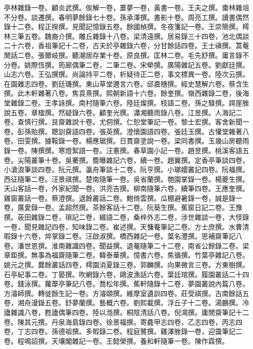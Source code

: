 \begin{pinyinscope}
亭林雜錄一卷。顧炎武撰。俟解一卷，噩夢一卷，黃書一卷。王夫之撰。棗林雜俎不分卷。談遷撰。春明夢餘錄七十卷。孫承澤撰。書影十卷。周亮工撰。讀書偶然錄十二卷。程正揆撰。見聞記憶錄五卷。餘國楨撰。冬夜箋記一卷。王崇簡撰。樗林三筆五卷。魏裔介撰。雕丘雜錄十八卷。梁清遠撰。居易錄三十四卷，池北偶談二十六卷，香祖筆記十二卷，古夫於亭雜錄六卷，分甘餘話四卷。王士禛撰。蒿菴閒話二卷。張爾岐撰。聽潮居存業十卷。原良撰。匡林二卷。毛先舒撰。庸言錄不分卷。姚際恆撰。筠廊偶筆二卷，二筆二卷。宋犖撰。廣陽雜記五卷。劉獻廷撰。山志六卷。王弘撰撰。尚論持平二卷，析疑待正二卷，事文標異一卷。陸次云撰。在園雜志四卷。劉廷璣撰。東山草堂邇言六卷。邱嘉穗撰。經史慧解六卷。蔡含生撰。此木軒雜著八卷。焦袁熹撰。熙朝新語十六卷。餘奎撰。嶺西雜錄二卷，後海堂雜錄二卷。王孝詠撰。南村隨筆六卷。陸廷燦撰。枝語二卷。孫之騄撰。諤崖脞說五卷。章楹撰。然疑錄六卷。顧奎光撰。瀟湘聽雨錄八卷。江昱撰。人海記二卷。查慎行撰。艮齋雜說十卷。尤侗撰。仁恕堂筆記一卷。黎士宏撰。客舍新聞一卷。彭孫貽撰。聰訓齋語四卷。張英撰。澄懷園語四卷。張廷玉撰。古懽堂雜著八卷。田雯撰。據鞍錄一卷。楊應琚撰。日貫齋塗說一卷。梁同書撰。玉幾山房聽雨錄一卷。陳撰撰。寒燈絮語一卷。汪憲撰。春草園小記一卷。趙昱撰。桃溪客語五卷。尖陽叢筆十卷。吳騫撰。簷曝雜記六卷，續一卷。趙翼撰。定香亭筆談四卷，小滄浪筆談四卷。阮元撰。瀛舟筆談十二卷。阮亨撰。小瑯嬛叢記四卷。阮福撰。西征隨筆二卷。汪景祺撰。楚南隨筆一卷。吳省蘭撰。匏園掌錄一卷。楊夔生撰。天山客話一卷，外家紀聞一卷。洪亮吉撰。柳南隨筆六卷，續筆四卷。王應奎撰。雞窗叢話一卷。蔡澄撰。退餘叢話二卷。鮑倚雲撰。瓜棚避暑錄一卷，誠是錄一卷，廣愛錄一卷。孟超然撰。茶餘客話十二卷。阮葵生撰。蕉窗日記二卷。王豫撰。荍田雜錄二卷，瑣記二卷，綴語二卷，桑梓外志二卷，涉世雜談一卷，大怪錄一卷，聞見雜記四卷，知味錄二卷。崔述撰。天慵菴筆記二卷。方士庶撰。水曹清暇錄十六卷，焠掌錄二卷。汪啟淑撰。橋西雜記一卷。葉名灃撰。思補齋筆記八卷。潘世恩撰。淮南雜識四卷。聞益撰。退菴隨筆二十二卷，南省公餘錄二卷。梁章鉅撰。無事為福齋隨筆二卷。韓泰華撰。憶書六卷。焦循撰。竹葉亭雜記八卷。姚元之撰。爨餘叢話四卷，樗園消夏錄三卷。郭麟撰。向果微言三卷。方東樹撰。石亭紀事二卷。丁晏撰。吹網錄六卷，鷗波漁話六卷。葉廷琯撰。履園叢話二十四卷。錢泳撰。蘿藦亭筆記八卷。喬松年撰。蕉軒隨錄十二卷，夢園叢說內篇八卷。方濬師撰。轉徙餘生記一卷。方濬頤撰。維摩室遺訓四卷。莊受祺撰。古南餘話五卷，湘舟漫錄五卷。舒夢蘭撰。藝概六卷。劉熙載撰。浮丘子十二卷。湯鵬撰。冷廬雜識八卷，甦廬偶筆四卷。陸以湉撰。桐陰清話八卷。倪鴻撰。庸閒齋筆記十二卷。陳其元撰。丹泉海島錄四卷。徐景福撰。寄龕甲志四卷，乙志四卷，丙志四卷，丁志四卷。孫德祖撰。多暇錄二卷。程庭鷺撰。雞澤脞錄一卷，迎靄筆記二卷。程鳴詔撰。天壤閣雜記一卷。王懿榮撰。養和軒隨筆一卷。陳作霖撰。


\end{pinyinscope}
